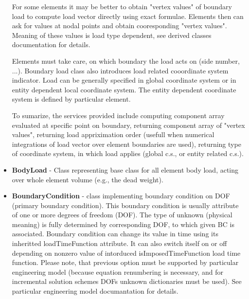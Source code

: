 \documentclass[12pt,draft]{article}
\newcommand{\class}[1]{{\bf #1}}
\newcommand{\attribute}[1]{#1}
\begin{document}
\begin{itemize}
For some elements it may be better to obtain "vertex values" of
boundary load to compute load vector directly using exact
formulae. Elements then can ask for values at nodal points and obtain
cooresponding "vertex values". Meaning of these values is load type
dependent, see derived classes documentation for details.


Elements must take care, on which boundary the load acts on (side
number, ...). Boundary load class also introduces load related
cooordinate system indicator. Load can be generally specified in
global coordinate system or in entity dependent local coordinate
system. The entity dependent coordinate system is defined by
particular element. 

To sumarize, the services provided include computing component array
evaluated at specific point on boundary, returning component array of
"vertex values", returning load appriximation order (usefull
when numerical integrations of load vector over element boundaries are
used), returning type of coordinate system, in which load
applies (global c.s., or entity related c.s.).

\item
\class{BodyLoad} - Class representing base class for all element body load, acting over
whole element volume (e.g., the dead weight). 

\item
\class{BoundaryCondition} - class implementing boundary condition on DOF (primary boundary condition). 
This boundary condition is usually attribute of one or more degrees of
freedom (DOF). The type of unknown (physical meaning) is fully
determined by corresponding DOF, to which given BC is associated. 
Boundary condition can change its value in time using its inheritted
\attribute{loadTimeFunction} attribute.
It can also switch itself on or off depending on nonzero value of intorduced
isImposedTimeFunction load time function. Please note, that previous option must be
supported by particular engineering model (because equation renumbering is necessary,
and for incremental solution schemes DOFs unknown dictionaries must be used). See particular
engineering model documantation for details.


\end{itemize}
\end{document}
